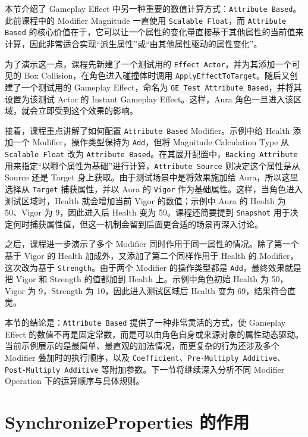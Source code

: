 \documentclass[10pt,CJKmath]{ctexart}
\begin{document}
本节介绍了 Gameplay Effect 中另一种重要的数值计算方式：\texttt{Attribute Based}。此前课程中的 Modifier Magnitude 一直使用 \texttt{Scalable Float}，而 \texttt{Attribute Based} 的核心价值在于，它可以让一个属性的变化量直接基于其他属性的当前值来计算，因此非常适合实现“派生属性”或“由其他属性驱动的属性变化”。

为了演示这一点，课程先新建了一个测试用的 \texttt{Effect Actor}，并为其添加一个可见的 Box Collision，在角色进入碰撞体时调用 \texttt{ApplyEffectToTarget}。随后又创建了一个测试用的 Gameplay Effect，命名为 \texttt{GE\_Test\_Attribute\_Based}，并将其设置为该测试 Actor 的 Instant Gameplay Effect。这样，Aura 角色一旦进入该区域，就会立即受到这个效果的影响。

接着，课程重点讲解了如何配置 \texttt{Attribute Based} Modifier。示例中给 Health 添加一个 Modifier，操作类型保持为 \texttt{Add}，但将 Magnitude Calculation Type 从 \texttt{Scalable Float} 改为 \texttt{Attribute Based}。在其展开配置中，\texttt{Backing Attribute} 用来指定“以哪个属性为基础”进行计算，\texttt{Attribute Source} 则决定这个属性是从 Source 还是 Target 身上获取。由于测试场景中是将效果施加给 Aura，所以这里选择从 \texttt{Target} 捕获属性，并以 Aura 的 \texttt{Vigor} 作为基础属性。这样，当角色进入测试区域时，Health 就会增加当前 Vigor 的数值；示例中 Aura 的 Health 为 50、Vigor 为 9，因此进入后 Health 变为 59。课程还简要提到 \texttt{Snapshot} 用于决定何时捕获属性值，但这一机制会留到后面更合适的场景再深入讨论。

之后，课程进一步演示了多个 Modifier 同时作用于同一属性的情况。除了第一个基于 Vigor 的 Health 加成外，又添加了第二个同样作用于 Health 的 Modifier，这次改为基于 \texttt{Strength}。由于两个 Modifier 的操作类型都是 \texttt{Add}，最终效果就是把 Vigor 和 Strength 的值都加到 Health 上。示例中角色初始 Health 为 50，Vigor 为 9，Strength 为 10，因此进入测试区域后 Health 变为 69，结果符合直觉。

本节的结论是：\texttt{Attribute Based} 提供了一种非常灵活的方式，使 Gameplay Effect 的数值不再是固定常数，而是可以由角色自身或来源对象的属性动态驱动。当前示例展示的是最简单、最直观的加法情况，而更复杂的行为还涉及多个 Modifier 叠加时的执行顺序，以及 \texttt{Coefficient}、\texttt{Pre-Multiply Additive}、\texttt{Post-Multiply Additive} 等附加参数。下一节将继续深入分析不同 Modifier Operation 下的运算顺序与具体规则。

\section{SynchronizeProperties 的作用}
\end{document}
